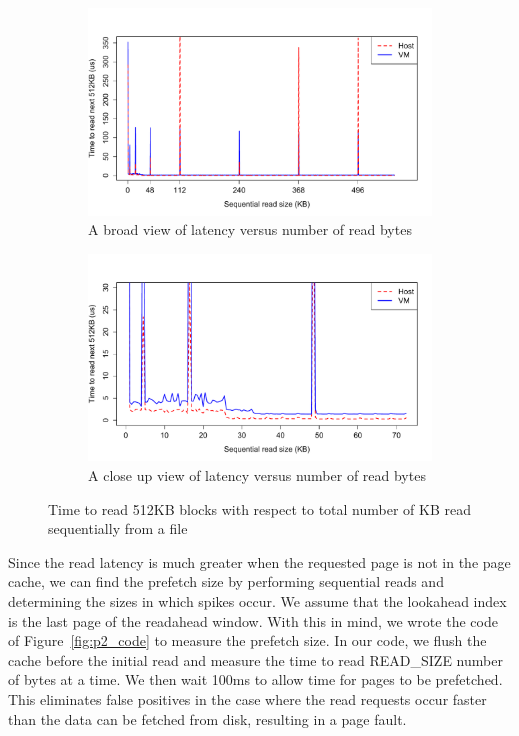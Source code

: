 \begin{figure}[hb!]
	\begin{subfigure}[t]{0.5\textwidth}
	\includegraphics[width=\textwidth]{./figures/p2_big.pdf}
	\caption{A broad view of latency versus number of read bytes}
	\label{fig:p2_graph_big}
	\end{subfigure}
	
	\begin{subfigure}[t]{0.5\textwidth}
	\includegraphics[width=\textwidth]{./figures/p2_small.pdf}
	\caption{A close up view of latency versus number of read bytes}
	\label{fig:p2_graph_small}
	\end{subfigure}
	\caption{Time to read 512KB blocks with respect to total number of KB read sequentially from a file}
\end{figure}

Since the read latency is much greater when the requested page is not in the page 
cache, we can find the prefetch size by performing sequential reads and determining
the sizes in which spikes occur. We assume that the lookahead index is the last 
page of the readahead window. With this in mind, we wrote the code of 
Figure~\ref{fig:p2_code} to measure the prefetch size. In our code, we flush 
the cache before the initial read and measure the time to read READ\_SIZE number of
bytes at a time. We then wait 100ms to allow time for pages to be prefetched. This
eliminates false positives in the case where the read requests occur faster than
the data can be fetched from disk, resulting in a page fault.


